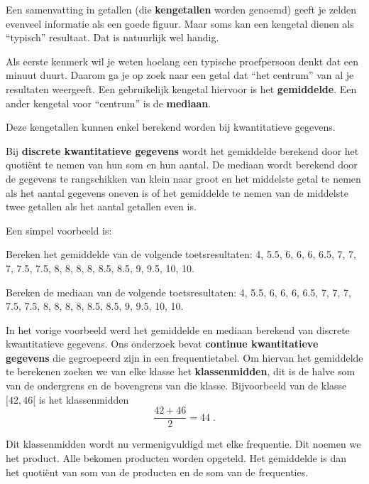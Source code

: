 \documentclass[12pt,twoside]{article}
\begin{document}
Een samenvatting in getallen (die {\bf kengetallen} worden genoemd) geeft je zelden evenveel
informatie als een goede figuur. Maar soms kan een kengetal dienen als “typisch” resultaat. Dat is
natuurlijk wel handig.

Als eerste kenmerk wil je weten hoelang een typische proefpersoon denkt dat een minuut duurt.
Daarom ga je op zoek naar een getal dat “het centrum” van al je resultaten weergeeft. Een
gebruikelijk kengetal hiervoor is het {\bf gemiddelde}. Een ander kengetal voor “centrum” is de
{\bf mediaan}.

Deze kengetallen kunnen enkel berekend worden bij kwantitatieve gegevens.

Bij {\bf discrete kwantitatieve gegevens} wordt het gemiddelde berekend door het quotiënt te nemen van hun som en hun aantal. De mediaan wordt berekend door de gegevens te rangschikken van klein naar groot en het middelste getal te nemen als het aantal gegevens oneven is of het gemiddelde te nemen van de middelste twee getallen als het aantal getallen even is.

Een simpel voorbeeld is:

\begin{oefening}
Bereken het gemiddelde van de volgende toetsresultaten: 4, 5.5, 6, 6, 6, 6.5, 7, 7, 7, 7.5, 7.5, 8, 8, 8, 8, 8.5, 8.5, 9, 9.5, 10, 10.\\
\ruitjes{3cm}
\end{oefening}

\begin{oefening}
Bereken de mediaan van de volgende toetsresultaten: 4, 5.5, 6, 6, 6, 6.5, 7, 7, 7, 7.5, 7.5, 8, 8, 8, 8, 8.5, 8.5, 9, 9.5, 10, 10.\\
\ruitjes{3cm}
\end{oefening}

In het vorige voorbeeld werd het gemiddelde en mediaan berekend van discrete kwantitatieve gegevens. Ons
onderzoek bevat {\bf continue kwantitatieve gegevens} die gegroepeerd zijn in een frequentietabel. Om hiervan
het gemiddelde te berekenen zoeken we van elke klasse het {\bf klassenmidden}, dit is de halve som van de
ondergrens en de bovengrens van die klasse. Bijvoorbeeld van de klasse $[42, 46[$ is het klassenmidden
$$
\frac{42 + 46}{2}=44\;.
$$

Dit klassenmidden wordt nu vermenigvuldigd met elke frequentie. Dit noemen we het product. Alle bekomen producten worden opgeteld. Het gemiddelde is dan het quotiënt van som van de producten en de som van de frequenties.
\newpage
\end{document}
